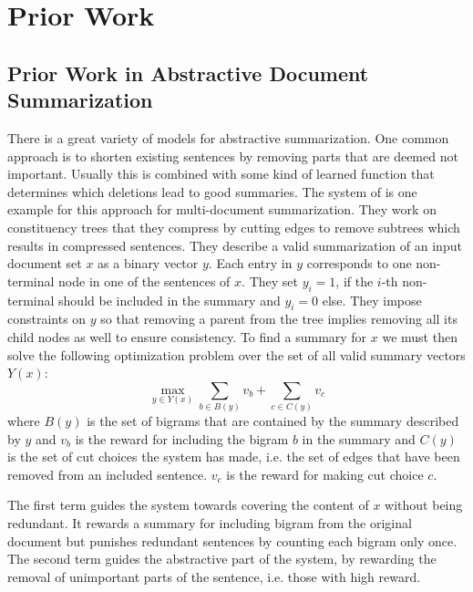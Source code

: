 \documentclass[a4paper,BCOR=10mm]{report}
\numberwithin{lemma}{chapter}
\numberwithin{definition}{chapter}
\begin{document}
\chapter{Prior Work} \label{sec:prior-work} 

\section{Prior Work in Abstractive Document Summarization} \label{sec:prior-work-mds} 

There is a great variety of models for abstractive summarization. One common approach is to shorten existing sentences by removing parts that are deemed not important. Usually this is combined with some kind of learned function that determines which deletions lead to good summaries.
The system of \citet{berg-kirkpatrick} is one example for this approach for multi-document summarization. They work on constituency trees that they compress by cutting edges to remove subtrees which results in compressed sentences.
They describe a valid summarization of an input document set $x$ as a binary vector $y$. Each entry in $y$ corresponds to one non-terminal node in one of the sentences of $x$. They set $y_i = 1$, if the $i$-th non-terminal should be included in the summary and $y_i = 0$ else. They impose constraints on $y$ so that removing a parent from the tree implies removing all its child nodes as well to ensure consistency.
To find a summary for $x$ we must then solve the following optimization problem over the set of all valid summary vectors $Y(x)$:
\begin{equation}
\max_{y \in Y(x)} \sum_{b \in B(y)} v_b + \sum_{c \in C(y)} v_c
\end{equation}
where $B(y)$ is the set of bigrams that are contained by the summary described by $y$ and $v_b$ is the reward for including the bigram $b$ in the summary and $C(y)$ is the set of cut choices the system has made, i.e. the set of edges that have been removed from an included sentence. $v_c$ is the reward for making cut choice $c$.

The first term guides the system towards covering the content of $x$ without being redundant. It rewards a summary for including bigram from the original document but punishes redundant sentences by counting each bigram only once.
The second term guides the abstractive part of the system, by rewarding the removal of unimportant parts of the sentence, i.e. those with high reward.

\end{document}
